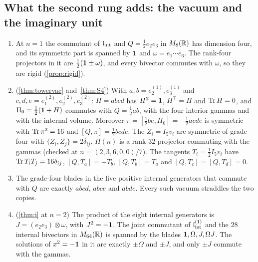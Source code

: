 \subsection{What the second rung adds: the vacuum and the imaginary unit}
\label{d5:sec:vacuum}

\begin{proposition}
\label{d5:prop:vacuum}
\begin{enumerate}[label=(\roman*),leftmargin=2.2em]
\item At $n=1$ the commutant of $\mathfrak l_{\rm int}$ and $Q=\tfrac12e_2e_3$ in $M_8(\mathbb{R})$ has dimension four, and its symmetric part is
spanned by $\mathbf 1$ and $\omega=e_1\cdots e_6$. The rank-four projectors in it are $\tfrac12(\mathbf 1\pm\omega)$, and every bivector commutes with
$\omega$, so they are rigid (\cref{prop:rigid}).
\item (\cref{thm:towervac} and~\cref{thm:S4}) With $a,b=e^{(1)}_2,e^{(1)}_3$ and $c,d,e=e^{(2)}_1,e^{(2)}_2,e^{(2)}_3$: $H=abcd$ has $H^2=\mathbf 1$, $H^{\!\top}=H$
and $\operatorname{Tr} H=0$, and $\Pi_0=\tfrac12(\mathbf 1+H)$ commutes with $Q=\tfrac12ab$, with the four interior gammas and with the internal volume. Moreover
$\pi=[\tfrac12be,\Pi_0]=-\tfrac12acde$ is symmetric with $\operatorname{Tr}\pi^2=16$ and $[Q,\pi]=\tfrac12bcde$. The $Z_i=I_5v_i$ are symmetric of grade four with
$\{Z_i,Z_j\}=2\delta_{ij}$. $\Pi(n)$ is a rank-$32$ projector commuting with the gammas (checked at $n=(2,3,6,0,0)/7$). The tangents
$T_i=\tfrac12I_5v_i$ have $\operatorname{Tr} T_iT_j=16\delta_{ij}$, $[Q,T_a]=-T_b$, $[Q,T_b]=T_a$ and $[Q,T_c]=[Q,T_d]=0$.
\item The grade-four blades in the five positive internal generators that commute with $Q$ are exactly $abcd$, $abce$ and $abde$. Every
such vacuum straddles the two copies.
\item (\cref{thm:i} at $n=2$) The product of the eight internal generators is $J=(e_2e_3)\otimes\omega$, with $J^2=-\mathbf 1$. The joint commutant
of $\mathfrak l_{\rm int}^{(1)}$ and the $28$ internal bivectors in $M_{64}(\mathbb{R})$ is spanned by the blades $\mathbf 1,\Omega,J,\Omega J$. The solutions of $x^2=-\mathbf 1$ in it are
exactly $\pm\Omega$ and $\pm J$, and only $\pm J$ commute with the gammas.
\end{enumerate}
\end{proposition}

